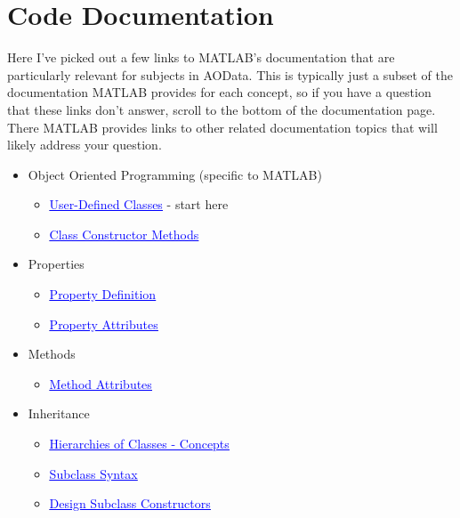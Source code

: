 \documentclass[10pt]{exam}
\newcommand\myurl[1]{\textcolor{blue}{\underline{#1}}}
\begin{document}
\section{Code Documentation}
	\label{section:CodeDoc}
	\noindent Here I've picked out a few links to MATLAB's documentation that are particularly relevant for subjects in AOData. This is typically just a subset of the documentation MATLAB provides for each concept, so if you have a question that these links don't answer, scroll to the bottom of the documentation page. There MATLAB provides links to other related documentation topics that will likely address your question.
	\\
	\begin{itemize}
		\item Object Oriented Programming (specific to MATLAB)
		\begin{itemize}
			\item \href{https://www.mathworks.com/help/matlab/matlab_oop/user-defined-classes.html}{\myurl{User-Defined Classes}} - start here
			\item \href{https://www.mathworks.com/help/matlab/matlab_oop/class-constructor-methods.html}{\myurl{Class Constructor Methods}}
		\end{itemize}
		\item Properties
		\begin{itemize}
			\item \href{https://www.mathworks.com/help/matlab/matlab_oop/specifying-properties.html}{\myurl{Property Definition}}
			\item \href{https://www.mathworks.com/help/matlab/matlab_oop/property-attributes.html}{\myurl{Property Attributes}}
		\end{itemize}
		\item Methods
		\begin{itemize}
			\item \href{https://www.mathworks.com/help/matlab/matlab_oop/method-attributes.html}{\myurl{Method Attributes}}
		\end{itemize}
		\item Inheritance
		\begin{itemize}
			\item \href{https://www.mathworks.com/help/matlab/matlab_oop/hierarchies-of-classes-concepts.html}{\myurl{Hierarchies of Classes - Concepts}}
			\item \href{https://www.mathworks.com/help/matlab/matlab_oop/subclass-syntax.html}{\myurl{Subclass Syntax}}
			\item \href{https://www.mathworks.com/help/matlab/matlab_oop/subclass-constructors.html}{\myurl{Design Subclass Constructors}}

\end{itemize}
\end{itemize}
\end{document}
